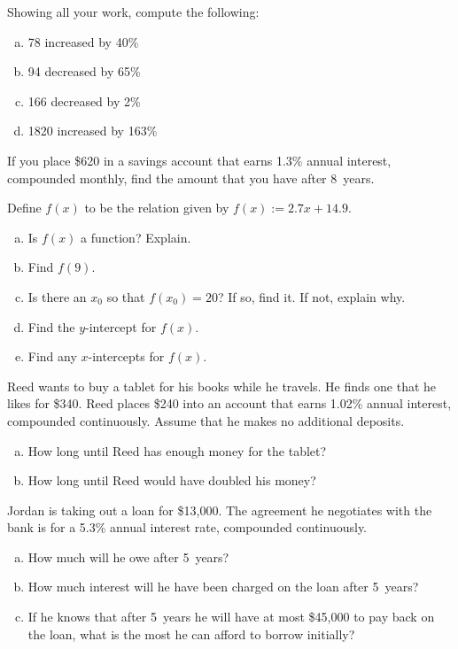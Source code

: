 \documentclass[11pt,letterpaper]{article}
\begin{document}
\prob Showing all your work, compute the following:
	\begin{enumerate}[(a)]
	\item 78 increased by 40\%
	\item 94 decreased by 65\%
	\item 166 decreased by 2\%
	\item 1820 increased by 163\%
	\end{enumerate} \pspace


\prob If you place \$620 in a savings account that earns 1.3\% annual interest, compounded monthly, find the amount that you have after 8~years. \pspace


\prob Define $f(x)$ to be the relation given by $f(x):= 2.7x + 14.9$.
	\begin{enumerate}[(a)]
	\item Is $f(x)$ a function? Explain.
	\item Find $f(9)$.
	\item Is there an $x_0$ so that $f(x_0)= 20$? If so, find it. If not, explain why. 
	\item Find the $y$-intercept for $f(x)$. 
	\item Find any $x$-intercepts for $f(x)$.
	\end{enumerate} \pspace


\prob Reed wants to buy a tablet for his books while he travels. He finds one that he likes for \$340. Reed places \$240 into an account that earns 1.02\% annual interest, compounded continuously. Assume that he makes no additional deposits. 
	\begin{enumerate}[(a)]
	\item How long until Reed has enough money for the tablet?
	\item How long until Reed would have doubled his money?
	\end{enumerate} \pspace


\prob Jordan is taking out a loan for \$13,000. The agreement he negotiates with the bank is for a 5.3\% annual interest rate, compounded continuously. 
	\begin{enumerate}[(a)]
	\item How much will he owe after 5~years?
	\item How much interest will he have been charged on the loan after 5~years?
	\item If he knows that after 5~years he will have at most \$45,000 to pay back on the loan, what is the most he can afford to borrow initially? 
	\end{enumerate} \pspace
\end{document}
